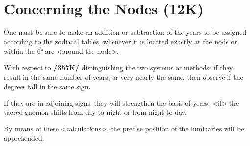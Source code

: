 \section{Concerning the Nodes (12K)}

One must be sure to make an addition or subtraction of the years to be assigned according to the zodiacal tables, whenever it is located exactly at the node or within the 6° arc <around the node>. 

With respect to \textbf{/357K/} distinguishing the two systems or methods: if they result in the same number of years, or very nearly the same, then observe if the degrees fall in the same sign. 

If they are in adjoining signs, they will strengthen the basis of years, <if> the sacred gnomon shifts from day to night or from night to day.

By means of these <calculations>, the precise position of the luminaries will be apprehended.

\newpage